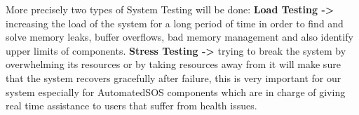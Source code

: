 \noindent
More precisely two types of System Testing will be done:
\medbreak
\textbf{Load Testing ->} increasing the load of the system for a long period of time in order to find and solve memory leaks, buffer overflows, bad memory management and also identify upper limits of components.
\medbreak
\textbf{Stress Testing ->} trying to break the system by overwhelming its resources or by taking resources away from it will make sure that the system recovers gracefully after failure, this is very important for our system especially for AutomatedSOS components which are in charge of giving real time assistance to users that suffer from health issues.




